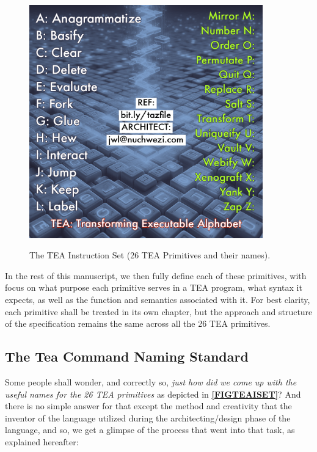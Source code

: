 \documentclass[a4paper, 18pt]{book} %
\begin{document}
\begin{figure}[H]
  \begin{center}
   \includegraphics[trim=0cm 1cm 0cm 0cm, clip, width=0.9\textwidth,]{resources/tea_cs_is.png}\\
   \caption{The TEA Instruction Set (26 TEA Primitives and their names).}
  \label{FIGTEAISET}
  \end{center}
\end{figure}

In the rest of this manuscript, we then fully define each of these primitives, with focus on what purpose each primitive serves in a TEA program, what syntax it expects, as well as the function and semantics associated with it. For best clarity, each primitive shall be treated in its own chapter, but the approach and structure of the specification remains the same across all the 26 TEA primitives.


\subsection{The Tea Command Naming Standard}

Some people shall wonder, and correctly so, \textit{just how did we come up with the useful names for the 26 TEA primitives} as depicted in \textbf{\autoref{FIGTEAISET}}? And there is no simple answer for that except the method and creativity that the inventor of the language utilized during the architecting/design phase of the language, and so, we get a glimpse of the process that went into that task, as explained hereafter:
\end{document}
